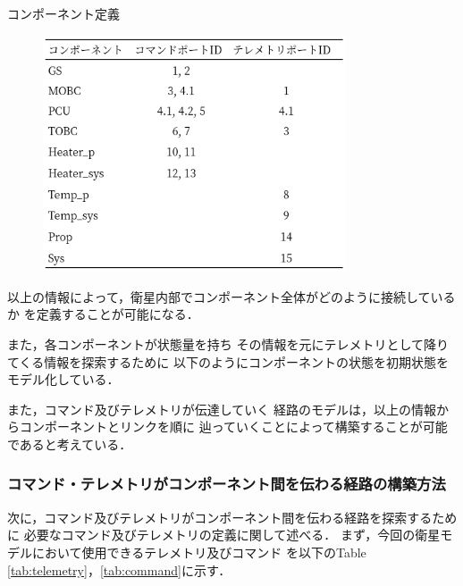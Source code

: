 \documentclass[11pt]{article}
\begin{document}
\begin{table}[H]
   \centering
   \caption{コンポーネント定義} 
   \label{tab:compo_port}
\end{table}
\vspace{-2zh}
\begin{figure}[H]
   \centering
      \includegraphics[height=7cm]{figure/compo_port.png}
\end{figure}

以上の情報によって，衛星内部でコンポーネント全体がどのように接続しているか
を定義することが可能になる．

また，各コンポーネントが状態量を持ち
その情報を元にテレメトリとして降りてくる情報を探索するために
以下のようにコンポーネントの状態を初期状態をモデル化している．

また，コマンド及びテレメトリが伝達していく
経路のモデルは，以上の情報からコンポーネントとリンクを順に
辿っていくことによって構築することが可能であると考えている．

\subsubsection{コマンド・テレメトリがコンポーネント間を伝わる経路の構築方法}
次に，コマンド及びテレメトリがコンポーネント間を伝わる経路を探索するために
必要なコマンド及びテレメトリの定義に関して述べる．
まず，今回の衛星モデルにおいて使用できるテレメトリ及びコマンド
を以下のTable \ref{tab:telemetry}，\ref{tab:command}に示す．
\end{document}
